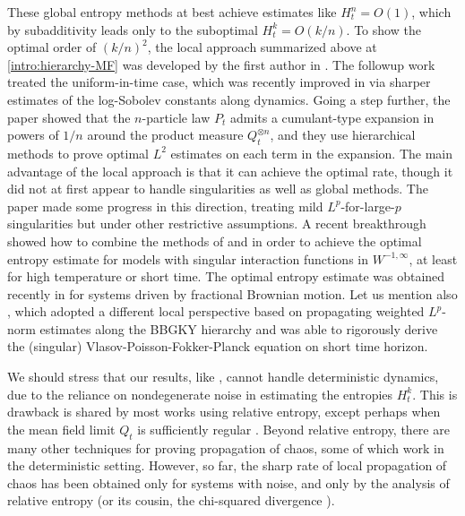 \documentclass[11pt,reqno]{amsart}
\numberwithin{equation}{section}
\theoremstyle{definition}
\begin{document}
These global entropy methods at best achieve estimates like $H^n_t = O(1)$, which by subadditivity leads only to the suboptimal $H^k_t = O(k/n)$. To show the optimal order of $(k/n)^2$, the local approach summarized above at \eqref{intro:hierarchy-MF} was developed by the first author in \cite{lacker2022hierarchies}.
The followup work \cite{lacker2023sharp} treated the uniform-in-time case, which was recently improved in \cite{monmarche2024time} via sharper estimates of the log-Sobolev constants along dynamics.
Going a step further, the paper \cite{hess2023higher} showed that the $n$-particle law $P_t$ admits a cumulant-type expansion in powers of $1/n$ around the product measure $Q_t^{\otimes n}$, and they use hierarchical methods to prove optimal $L^2$ estimates on each term in the expansion.
The main advantage of the local approach is that it can achieve the optimal rate, though it did not at first appear to handle singularities as well as global methods.
The paper \cite{han2022entropic} made some progress in this direction, treating mild $L^p$-for-large-$p$ singularities but under other restrictive assumptions.
A recent breakthrough \cite{wang2024sharp} showed how to combine the methods of \cite{lacker2022hierarchies} and \cite{jabin2018quantitative} in order to achieve the optimal entropy estimate for models with singular interaction functions in $W^{-1,\infty}$, at least for high temperature or short time.
The optimal entropy estimate was obtained recently in \cite{hu2024mimicking} for systems driven by fractional Brownian motion.
Let us mention also \cite{bresch2022new}, which adopted a different local perspective based on propagating weighted $L^p$-norm estimates along the BBGKY hierarchy and was able to rigorously derive the (singular)  Vlasov-Poisson-Fokker-Planck equation on short time horizon.

We should stress that our results, like \cite{lacker2022hierarchies}, cannot handle deterministic dynamics, due to the reliance on nondegenerate noise in estimating the entropies $H^k_t$. This is drawback is shared by most works using relative entropy, except perhaps when the mean field limit $Q_t$ is sufficiently regular  \cite{jabin2016mean}. Beyond relative entropy, there are many other techniques for proving propagation of chaos, some of which work in the deterministic setting. However, so far, the sharp rate of local propagation of chaos has  been obtained only for systems with noise, and only by the analysis of relative entropy (or its cousin, the chi-squared divergence \cite{hess2023higher}).
\end{document}
